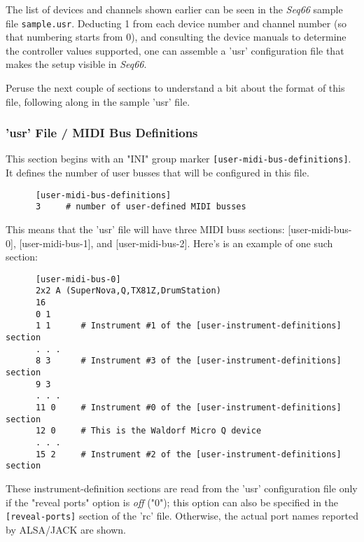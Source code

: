    The list of devices and channels shown earlier
   can be seen in the \textsl{Seq66} sample file
   \texttt{sample.usr}.
   Deducting 1 from each device number and channel number (so that numbering
   starts from 0), and consulting the device manuals to determine the
   controller values supported, one can assemble a 'usr' configuration file
   that makes the setup visible in \textsl{Seq66}.

   Peruse the next couple of sections to understand a bit about the format of
   this file, following along in the sample 'usr' file.

\subsubsection{'usr' File / MIDI Bus Definitions}
\label{subsubsec:usr_file_midi_bus_definitions}

   This section begins with an
   "INI" group marker \texttt{[user-midi-bus-definitions]}.
   It defines the number of user busses that will be configured in this file.

   \begin{verbatim}
      [user-midi-bus-definitions]
      3     # number of user-defined MIDI busses
   \end{verbatim}

   This means that the 'usr' file will have three MIDI buss
   sections: [user-midi-bus-0], [user-midi-bus-1], and [user-midi-bus-2].
   Here's is an example of one such section:

   \begin{verbatim}
      [user-midi-bus-0]
      2x2 A (SuperNova,Q,TX81Z,DrumStation)
      16
      0 1
      1 1      # Instrument #1 of the [user-instrument-definitions] section
      . . .
      8 3      # Instrument #3 of the [user-instrument-definitions] section
      9 3
      . . .
      11 0     # Instrument #0 of the [user-instrument-definitions] section
      12 0     # This is the Waldorf Micro Q device
      . . .
      15 2     # Instrument #2 of the [user-instrument-definitions] section
   \end{verbatim}

   These instrument-definition
   sections are read from the 'usr' configuration file only if
   the "reveal ports" option is \textsl{off} ("0");
   this option can also be specified in the
   \texttt{[reveal-ports]} section of the 'rc' file.
   Otherwise, the actual port names reported by ALSA/JACK are shown.


